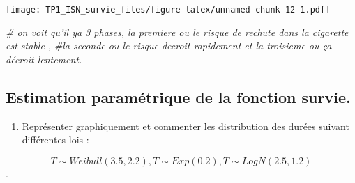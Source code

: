 \documentclass[
]{article}
\newenvironment{Shaded}{\begin{snugshade}}{\end{snugshade}}
\newcommand{\CommentTok}[1]{\textcolor[rgb]{0.56,0.35,0.01}{\textit{#1}}}
\newcommand{\DataTypeTok}[1]{\textcolor[rgb]{0.13,0.29,0.53}{#1}}
\newcommand{\DecValTok}[1]{\textcolor[rgb]{0.00,0.00,0.81}{#1}}
\newcommand{\KeywordTok}[1]{\textcolor[rgb]{0.13,0.29,0.53}{\textbf{#1}}}
\newcommand{\NormalTok}[1]{#1}
\newcommand{\OperatorTok}[1]{\textcolor[rgb]{0.81,0.36,0.00}{\textbf{#1}}}
\newcommand{\OtherTok}[1]{\textcolor[rgb]{0.56,0.35,0.01}{#1}}
\newcommand{\StringTok}[1]{\textcolor[rgb]{0.31,0.60,0.02}{#1}}
\providecommand{\tightlist}{%
  \setlength{\itemsep}{0pt}\setlength{\parskip}{0pt}}
\begin{document}
\begin{Shaded}
\end{Shaded}

\texttt{[image: TP1\_ISN\_survie\_files/figure-latex/unnamed-chunk-12-1.pdf]}

\begin{Shaded}
\begin{Highlighting}[]
\CommentTok{# on voit qu'il ya 3 phases, la premiere ou le risque de rechute dans la cigarette est stable , }
\CommentTok{#la seconde ou le risque decroit rapidement et la troisieme ou ça décroit lentement.}
\end{Highlighting}
\end{Shaded}

\hypertarget{estimation-paramuxe9trique-de-la-fonction-survie.}{%
\subsection{Estimation paramétrique de la fonction
survie.}\label{estimation-paramuxe9trique-de-la-fonction-survie.}}

\begin{enumerate}
\def\labelenumi{\arabic{enumi})}
\setcounter{enumi}{8}
\tightlist
\item
  Représenter graphiquement et commenter les distribution des durées
  suivant différentes lois :
\end{enumerate}

\[T\sim Weibull\left(3.5, 2.2\right),T\sim Exp\left(0.2\right), T\sim LogN\left(2.5, 1.2\right) \].
\end{document}

